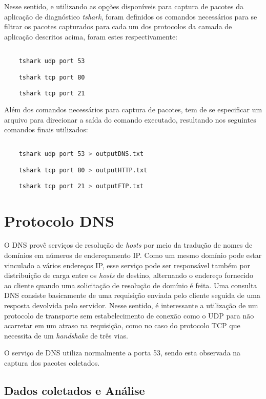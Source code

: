 \documentclass[a4paper]{report} %
\begin{document}
	Nesse sentido, e utilizando as opções disponíveis para captura de pacotes da aplicação de diagnóstico \textit{tshark}, foram definidos os comandos necessários para se filtrar os pacotes capturados para cada um dos protocolos da camada de aplicação descritos acima, foram estes respectivamente:
\begin{lstlisting}[language=bash]

	tshark udp port 53

	tshark tcp port 80

	tshark tcp port 21

\end{lstlisting}

	Além dos comandos necessários para captura de pacotes, tem de se especificar um arquivo para direcionar a saída do comando executado, resultando nos seguintes comandos finais utilizados:
\begin{lstlisting}[language=bash]

	tshark udp port 53 > outputDNS.txt

	tshark tcp port 80 > outputHTTP.txt

	tshark tcp port 21 > outputFTP.txt

\end{lstlisting}

\section{Protocolo DNS}
\label{sec_dns}
		O DNS provê serviços de resolução de \textit{hosts} por meio da tradução de nomes de domínios em números de endereçamento IP. Como um mesmo domínio pode estar vinculado a vários endereços IP, esse serviço pode ser responsável também por distribuição de carga entre os \textit{hosts} de destino, alternando o endereço fornecido ao cliente quando uma solicitação de resolução de domínio é feita. Uma consulta DNS consiste basicamente de uma requisição enviada pelo cliente seguida de uma resposta devolvida pelo servidor. Nesse sentido, é interessante a utilização de um protocolo de transporte sem estabelecimento de conexão como o UDP para não acarretar em um atraso na requisição, como no caso do protocolo TCP que necessita de um \textit{handshake} de três vias.

		O serviço de DNS utiliza normalmente a porta 53, sendo esta observada na captura dos pacotes coletados.
\subsection{Dados coletados e Análise}
\label{sub_dns_dados}
\end{document}
